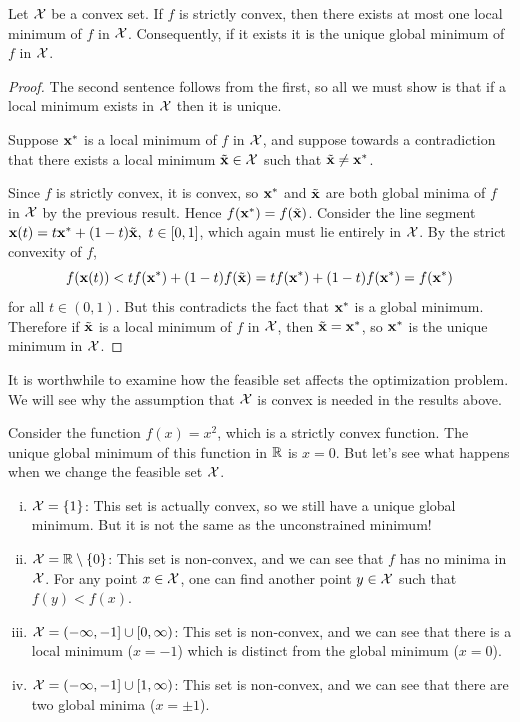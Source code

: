 \begin{proposition}
Let $\mathcal{X}$ be a convex set.
If $f$ is strictly convex, then there exists at most one local minimum of $f$ in $\mathcal{X}$.
Consequently, if it exists it is the unique global minimum of $f$ in $\mathcal{X}$.
\end{proposition}
\begin{proof}
The second sentence follows from the first, so all we must show is that if a local minimum exists in $\mathcal{X}$ then it is unique.

Suppose $\mathbf{x}^*$ is a local minimum of $f$ in $\mathcal{X}$, and suppose towards a contradiction that there exists a local minimum $\tilde{\mathbf{x}} \in \mathcal{X}$ such that $\tilde{\mathbf{x}} \neq \mathbf{x}^*$.

Since $f$ is strictly convex, it is convex, so $\mathbf{x}^*$ and $\tilde{\mathbf{x}}$ are both global minima of $f$ in $\mathcal{X}$ by the previous result.
Hence $f(\mathbf{x}^*) = f(\tilde{\mathbf{x}})$.
Consider the line segment $\mathbf{x}(t) = t\mathbf{x}^* + (1-t)\tilde{\mathbf{x}}, ~ t \in [0,1]$, which again must lie entirely in $\mathcal{X}$.
By the strict convexity of $f$,
\[f(\mathbf{x}(t)) < tf(\mathbf{x}^*) + (1-t)f(\tilde{\mathbf{x}}) = tf(\mathbf{x}^*) + (1-t)f(\mathbf{x}^*) = f(\mathbf{x}^*)\]
for all $t \in (0,1)$.
But this contradicts the fact that $\mathbf{x}^*$ is a global minimum.
Therefore if $\tilde{\mathbf{x}}$ is a local minimum of $f$ in $\mathcal{X}$, then $\tilde{\mathbf{x}} = \mathbf{x}^*$, so $\mathbf{x}^*$ is the unique minimum in $\mathcal{X}$.
\end{proof}

It is worthwhile to examine how the feasible set affects the optimization problem.
We will see why the assumption that $\mathcal{X}$ is convex is needed in the results above.

Consider the function $f(x) = x^2$, which is a strictly convex function.
The unique global minimum of this function in $\mathbb{R}$ is $x = 0$.
But let's see what happens when we change the feasible set $\mathcal{X}$.
\begin{enumerate}[(i)]
\item $\mathcal{X} = \{1\}$: This set is actually convex, so we still have a unique global minimum.
But it is not the same as the unconstrained minimum!

\item $\mathcal{X} = \mathbb{R} \setminus \{0\}$: This set is non-convex, and we can see that $f$ has no minima in $\mathcal{X}$.
For any point $x \in \mathcal{X}$, one can find another point $y \in \mathcal{X}$ such that $f(y) < f(x)$.

\item $\mathcal{X} = (-\infty,-1] \cup [0,\infty)$: This set is non-convex, and we can see that there is a local minimum ($x = -1$) which is distinct from the global minimum ($x = 0$).

\item $\mathcal{X} = (-\infty,-1] \cup [1,\infty)$: This set is non-convex, and we can see that there are two global minima ($x = \pm 1$).
\end{enumerate}

